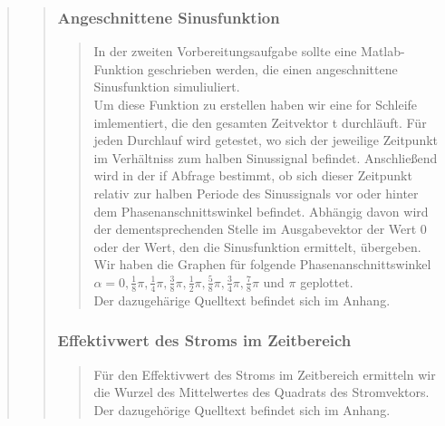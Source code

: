 \begin{quote}
\begin{quote}
\begin{quote}
        \end{quote}
        
    	\subsubsection{Angeschnittene Sinusfunktion}
        \begin{quote}
            In der zweiten Vorbereitungsaufgabe sollte eine Matlab-Funktion
            geschrieben werden, die einen angeschnittene Sinusfunktion simuliuliert.\\
            Um diese Funktion zu erstellen haben wir eine for Schleife
            imlementiert, die den gesamten Zeitvektor t durchläuft. Für jeden Durchlauf wird getestet, 
            wo sich der jeweilige Zeitpunkt im Verhältniss zum halben
            Sinussignal befindet. Anschließend wird in der if Abfrage bestimmt, ob sich dieser Zeitpunkt relativ zur halben
            Periode des Sinussignals vor oder hinter dem Phasenanschnittswinkel befindet. Abhängig davon wird der
            dementsprechenden Stelle im Ausgabevektor der Wert $0$ oder der
            Wert, den die Sinusfunktion ermittelt, übergeben.\\
            Wir haben die Graphen für folgende Phasenanschnittswinkel $ \alpha = 0, \frac{1}{8} \pi, \frac{1}{4}
            \pi, \frac{3}{8} \pi, \frac{1}{2} \pi,\frac{5}{8} \pi, \frac{3}{4} \pi, \frac{7}{8} \pi$ und $\pi$
            geplottet.\\
            Der dazugehärige Quelltext befindet sich im Anhang.
        \end{quote}
        
        \subsubsection{Effektivwert des Stroms im Zeitbereich}
        \begin{quote}
            Für den Effektivwert des Stroms im Zeitbereich ermitteln wir die Wurzel des Mittelwertes des Quadrats des
            Stromvektors.\\
            Der dazugehörige Quelltext befindet sich im Anhang.
        \end{quote}
        

\end{quote}
\end{quote}
